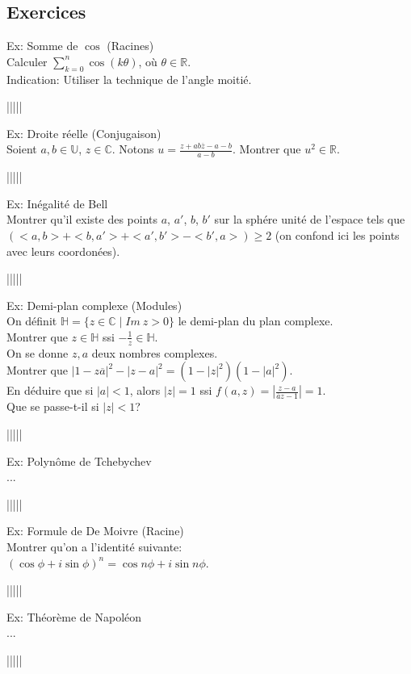 \documentclass{article}
\begin{document}
\subsection{Exercices}
Ex: Somme de $\cos$ (Racines)\\
Calculer $\sum\limits_{k=0}^{n}\cos(k\theta)$, o\`u $\theta\in\mathbb{R}$.\\
Indication: Utiliser la technique de l'angle moiti\'e.
\begin{center}
|||||
\end{center}
Ex: Droite r\'eelle (Conjugaison)\\
Soient $a,b\in\mathbb{U}$, $z\in\mathbb{C}$. Notons $u=\frac{z+ab\overline{z}-a-b}{a-b}$. Montrer que $u^2\in\mathbb{R}$.
\begin{center}
|||||
\end{center}
Ex: In\'egalit\'e de Bell\\
Montrer qu'il existe des points $a$, $a'$, $b$, $b'$ sur la sph\'ere unit\'e de l'espace tels que $(<a,b>+<b,a'>+<a',b'>-<b',a>)\geq 2$ (on confond ici les points avec leurs coordon\'ees).
\begin{center}
|||||
\end{center}
Ex: Demi-plan complexe (Modules)\\
On d\'efinit $\mathbb{H}=\{z\in\mathbb{C}\mid Im~z>0\}$ le demi-plan du plan complexe.\\
Montrer que $z\in\mathbb{H}$ ssi $-\frac{1}{z}\in\mathbb{H}$.\\
On se donne $z,a$ deux nombres complexes.\\
Montrer que $|1-z\overline{a}|^2-|z-a|^2=(1-|z|^2)(1-|a|^2)$.\\
En d\'eduire que si $|a|<1$, alors $|z|=1$ ssi $f(a,z)=|\frac{z-a}{\overline{a}z-1}|=1$.\\
Que se passe-t-il si $|z|<1$?
\begin{center}
|||||
\end{center}
Ex: Polyn\^ome de Tchebychev\\
...
\begin{center}
|||||
\end{center}
Ex: Formule de De Moivre (Racine)\\
Montrer qu'on a l'identit\'e suivante:\\
$(\cos\phi+i\sin\phi)^n=\cos n\phi+i\sin n\phi$.
\begin{center}
|||||
\end{center}
Ex: Th\'eor\`eme de Napol\'eon\\
...
\begin{center}
|||||
\end{center}
\end{document}
